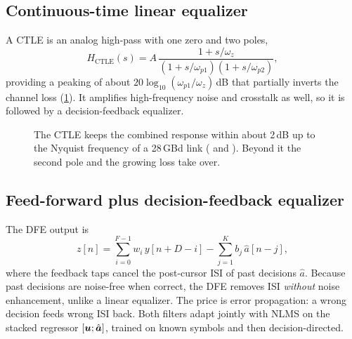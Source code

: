 \subsection{Continuous-time linear equalizer}
A CTLE is an analog high-pass with one zero and two poles,
\begin{equation}
  H_{\mathrm{CTLE}}(s)=A\,\frac{1+s/\omega_z}{(1+s/\omega_{p1})(1+s/\omega_{p2})},
\end{equation}
providing a peaking of about $20\log_{10}(\omega_{p1}/\omega_z)$\,dB that partially inverts the
channel loss (\cref{fig:ctle}). It amplifies high-frequency noise and crosstalk as well, so it
is followed by a decision-feedback equalizer.

\begin{figure}[htbp]
\centering
{}
\caption{The CTLE keeps the combined response within about 2\,dB up to the Nyquist frequency of
a 28\,GBd link ( and ). Beyond it the second pole and
the growing loss take over.}
\label{fig:ctle}
\end{figure}

\subsection{Feed-forward plus decision-feedback equalizer}
The DFE output is
\begin{equation}
  z[n]=\sum_{i=0}^{F-1}w_i\,y[n+D-i]-\sum_{j=1}^{K}b_j\,\hat a[n-j],
\end{equation}
where the feedback taps cancel the post-cursor ISI of past decisions $\hat a$. Because past
decisions are noise-free when correct, the DFE removes ISI \emph{without} noise enhancement,
unlike a linear equalizer. The price is error propagation: a wrong decision feeds wrong ISI back.
Both filters adapt jointly with NLMS on the stacked regressor $[\bm{u};\hat{\bm{a}}]$, trained on
 known symbols and then decision-directed.

